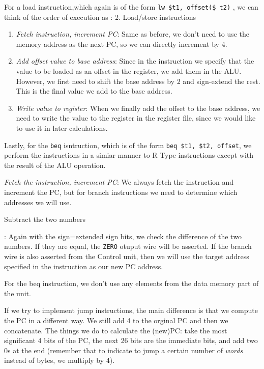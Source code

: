 \documentclass{article}
\begin{document}
 For a load instruction,which again is of the form \texttt{lw \$t1, offset(\$ t2)} , we can think of the order of execution as :
 2. Load/store instructions
 \begin{enumerate}
		 \item{\textit{Fetch instruction, increment PC}}: Same as before, we don't need to use the memory address
				 as the next PC, so we can directly increment by 4.
		 \item{\textit{Add offset value to base address}}: Since in the instruction we specify that the value
				 to be loaded as an offset in the register, we add them in the ALU. However, we first need
				 to shift the base address by 2 and sign-extend the rest. This is the final value we add to
				 the base address.
		 \item{\textit{Write value to register}}: When we finally add the offset to the base address, we need
				 to write the value to the register in the register file, since we would like to use it
				 in later calculations.
 \end{enumerate}
Lastly, for the \texttt{beq} isntruction, which is of the form \texttt{beq \$t1, \$t2, offset}, we perform 
the instructions in a simiar manner to R-Type instructions except with the result of the ALU operation.
\begin{enumerate}
		\item{\textit{Fetch the instruction, increment PC}}: We always fetch the instruction and increment the
				PC, but for branch instructions we need to determine which addresses we will use.
		\item{\item{Subtract the two numbers}}: Again with the sign=extended sign bits, we check the difference
				of the two numbers. If they are equal, the \texttt{ZERO} otuput wire will be asserted. If the 
				branch wire is also asserted from the Control unit, then we will use the target address
				specified in the instruction as our new PC address.
\end{enumerate}
For the beq instruction, we don't use any elements from the data memory part of the unit.

If we try to implement jump instructions, the main difference is that we compute the PC in a different way. We still
add 4 to the orginal PC and then we concatenate. The things we do to calculate the (new)PC: take the most 
significant 4 bits of the PC, the next 26 bits are the immediate bits, and add two 0s at the end (remember that
to indicate to jump a certain number of \textit{words} instead of bytes, we multiply by 4).
\end{document}
